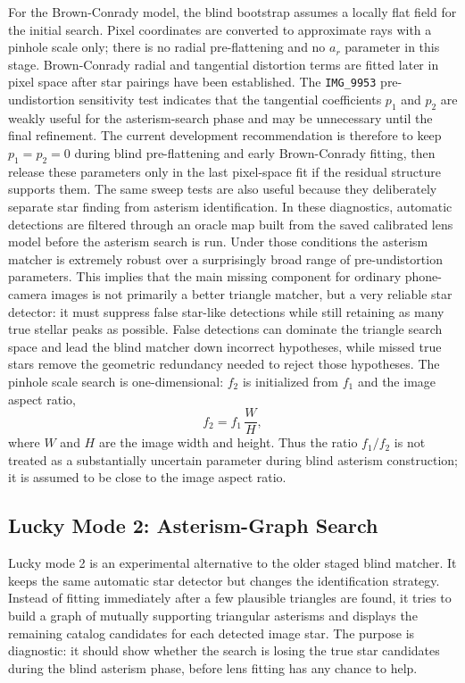 \documentclass[11pt]{article}
\begin{document}
For the Brown-Conrady model, the blind bootstrap assumes a locally flat field
for the initial search. Pixel coordinates are converted to approximate rays
with a pinhole scale only; there is no radial pre-flattening and no \(a_r\)
parameter in this stage. Brown-Conrady radial and tangential distortion terms
are fitted later in pixel space after star pairings have been established.
The \texttt{IMG\_9953} pre-undistortion sensitivity test indicates that the
tangential coefficients \(p_1\) and \(p_2\) are weakly useful for the
asterism-search phase and may be unnecessary until the final refinement.
The current development recommendation is therefore to keep
\(p_1=p_2=0\) during blind pre-flattening and early Brown-Conrady fitting,
then release these parameters only in the last pixel-space fit if the residual
structure supports them.
The same sweep tests are also useful because they deliberately separate star
finding from asterism identification. In these diagnostics, automatic
detections are filtered through an oracle map built from the saved calibrated
lens model before the asterism search is run. Under those conditions the
asterism matcher is extremely robust over a surprisingly broad range of
pre-undistortion parameters. This implies that the main missing component for
ordinary phone-camera images is not primarily a better triangle matcher, but a
very reliable star detector: it must suppress false star-like detections while
still retaining as many true stellar peaks as possible. False detections can
dominate the triangle search space and lead the blind matcher down incorrect
hypotheses, while missed true stars remove the geometric redundancy needed to
reject those hypotheses.
The pinhole scale search is one-dimensional: \(f_2\) is initialized from
\(f_1\) and the image aspect ratio,
\begin{equation}
  f_2 = f_1\,\frac{W}{H},
\end{equation}
where \(W\) and \(H\) are the image width and height. Thus the ratio
\(f_1/f_2\) is not treated as a substantially uncertain parameter during blind
asterism construction; it is assumed to be close to the image aspect ratio.

\subsection{Lucky Mode 2: Asterism-Graph Search}

Lucky mode 2 is an experimental alternative to the older staged blind matcher.
It keeps the same automatic star detector but changes the identification
strategy. Instead of fitting immediately after a few plausible triangles are
found, it tries to build a graph of mutually supporting triangular asterisms
and displays the remaining catalog candidates for each detected image star.
The purpose is diagnostic: it should show whether the search is losing the
true star candidates during the blind asterism phase, before lens fitting has
any chance to help.
\end{document}
